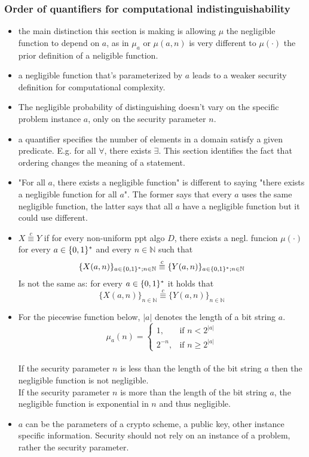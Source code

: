 \subsubsection*{Order of quantifiers for computational indistinguishability}
\begin{itemize}
    \item the main distinction this section is making is allowing $\mu$ the negligible function to depend on $a$, as in $\mu_a$ or $\mu(a,n)$ is very different to $\mu(\cdot)$ the prior definition of a neligible function. 
    \item a negligible function that's parameterized by $a$ leads to a weaker security definition for computational complexity. 
    \item The negligible probability of distinguishing doesn't vary on the specific problem instance $a$, only on the security parameter $n$.
    \item a quantifier specifies the number of elements in a domain satisfy a given predicate. E.g. for all $\forall$, there exists $\exists$. This section identifies the fact that ordering changes the meaning of a statement.
    \item "For all $a$, there exists a negligible function" is different to saying "there exists a negligible function for all $a$". The former says that every $a$ uses the same negligible function, the latter says that all $a$ have a negligible function but it could use different.
    \item $X \stackrel{c}{\equiv} Y$ if for every non-uniform ppt algo $D$, there exists a negl. funcion $\mu(\cdot)$ for every $a\in\{0,1\}^*$ and every $n \in \mathbb{N}$ such that
    $$
    \{X(a,n)\}_{a\in\{0,1\}^*; n \in \mathbb{N}}  \stackrel{c}{\equiv} \{Y(a,n)\}_{a\in\{0,1\}^*; n \in \mathbb{N}}
    $$
    Is not the same as: for every $a\in\{0,1\}^*$ it holds that 
    $$
    \{X(a,n)\}_{n \in \mathbb{N}}  \stackrel{c}{\equiv} \{Y(a,n)\}_{n \in \mathbb{N}}
    $$
    \item For the piecewise function below, $|a|$ denotes the length of a bit string $a$. 
    $$
    \mu_a(n)=
    \begin{cases}
        1, & \text{if } n < 2^{|a|} \\
        2^{-n}, & \text{if } n \geq 2^{|a|}
    \end{cases}
    $$\\
    If the security parameter $n$ is less than the length of the bit string $a$ then the negligible function is not negligible. \\
    If the security parameter $n$ is more than the length of the bit string $a$, the negligible function is exponential in $n$ and thus negligible.
    \item $a$ can be the parameters of a crypto scheme, a public key, other instance specific information. Security should not rely on an instance of a problem, rather the security parameter.
\end{itemize}

